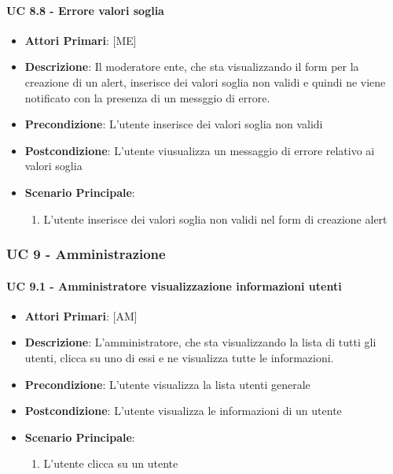 			\paragraph{UC 8.8 - Errore valori soglia}
			\begin{itemize}
				\item \textbf{Attori Primari}: [ME]
				\item \textbf{Descrizione}: Il moderatore ente, che sta visualizzando il form per la creazione di un alert, inserisce dei valori soglia non validi e quindi ne viene notificato con la presenza di un messggio di errore.
				\item \textbf{Precondizione}: L'utente inserisce dei valori soglia non validi
				\item \textbf{Postcondizione}: L'utente viusualizza un messaggio di errore relativo ai valori soglia 
				\item \textbf{Scenario Principale}:
				\begin{enumerate}
					\item{L'utente inserisce dei valori soglia non validi nel form di creazione alert}
				\end{enumerate}
			\end{itemize}

		\subsubsection{UC 9 - Amministrazione}

			\paragraph{UC 9.1 - Amministratore visualizzazione informazioni utenti}
			\begin{itemize}
				\item \textbf{Attori Primari}: [AM]
				\item \textbf{Descrizione}: L'amministratore, che sta visualizzando la lista di tutti gli utenti, clicca su uno di essi e ne visualizza tutte le informazioni.
				\item \textbf{Precondizione}: L'utente visualizza la lista utenti generale
				\item \textbf{Postcondizione}: L'utente visualizza le informazioni di un utente 
				\item \textbf{Scenario Principale}:
				\begin{enumerate}
					\item{L'utente clicca su un utente}
				\end{enumerate}	
			\end{itemize}

